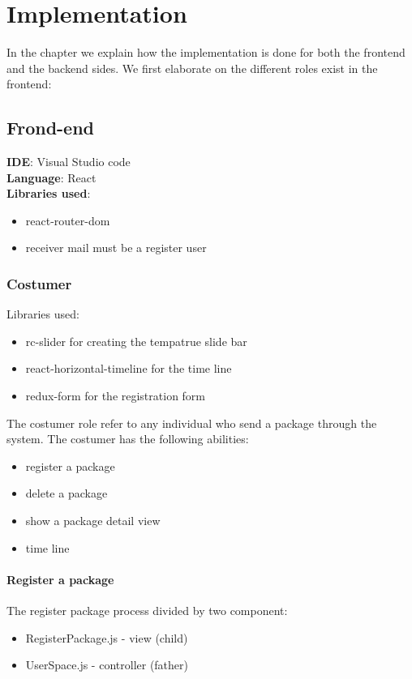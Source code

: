 \chapter{Implementation}
\label{cha:implementation}

In the chapter we explain how the implementation is done for both the frontend and the backend sides.
We first elaborate on the different roles exist in the frontend:

\section{Frond-end}

\textbf{IDE}: Visual Studio code\\
\textbf{Language}: React\\
\textbf{Libraries used}:
\begin{itemize}
    \item react-router-dom
    \item receiver mail must be a register user
\end{itemize}


\subsection{Costumer}
Libraries used:
\begin{itemize}
\item rc-slider for creating the tempatrue slide bar 
\item react-horizontal-timeline for the time line
\item redux-form for the registration form
\end{itemize}

The costumer role refer to any individual who send a package through the system.
The costumer has the following abilities:

\begin{itemize}
    \item register a package
    \item delete a package
    \item show a package detail view 
    \item time line
\end{itemize}


\subsubsection{Register a package}
The register package process divided by two component:
\begin{itemize}
\item RegisterPackage.js - view (child)
\item UserSpace.js - controller (father)
\end{itemize}


